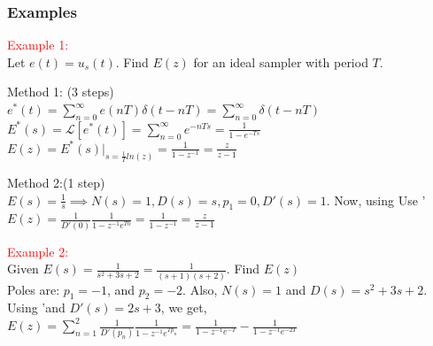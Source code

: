 \documentclass[mathserif, 10pt]{beamer} %
\def\2{\raisebox{.5pt}{\textcircled{\raisebox{-.9pt} {2}}}}
\begin{document}
\frame
{

\normalsize

\frametitle{Examples}

\textcolor{red}{ Example 1:}\\

Let $e(t) = u_s(t)$.  Find $E(z)$ for an ideal sampler with period $T$.\\ \vspace{.05in}

Method 1: (3 steps)\\
$e^*(t) = \sum\limits_{n=0}^{\infty} e(nT) \delta(t-nT) = \sum\limits_{n=0}^\infty \delta(t-nT)$\\
$E^*(s) = \mathcal{L}[e^*(t)] = \sum\limits_{n=0}^{\infty} e^{-nTs} = \frac{1}{1-e^{-Ts}}$\\
$E(z) = E^*(s)|_{s=\frac{1}{T}ln(z)} = \frac{1}{1-z^{-1}} = \frac{z}{z-1}$\\ \vspace{.07in}

Method 2:(1 step)\\

$E(s) = \frac{1}{s} \implies N(s) = 1, D(s) = s, p_1=0,D'(s) = 1$. Now, using Use \2'\\

$E(z) = \frac{1}{D'(0)}\frac{1}{1-z^{-1}e^{T0}} = \frac{1}{1-z^{-1}} = \frac{z}{z-1}$


\textcolor{red}{ Example 2:}\\

Given $E(s) = \frac{1}{s^2+3s+2} = \frac{1}{(s+1)(s+2)}$.  Find $E(z)$\\ \vspace{.05in}
Poles are:  $p_1 = -1$, and  $p_2 = -2$. Also, $N(s) = 1$ and
$D(s) = s^2+3s+2$. \\
Using \2'and $D'(s) = 2s+3$, we get, \\

$E(z) = \sum\limits_{n=1}^2 \frac{1}{D'(p_n)}\frac{1}{1-z^{-1}e^{Tp_n}} = \frac{1}{1-z^{-1}e^{-T}}-\frac{1}{1-z^{-1}e^{-2T}}$ \\




}
\end{document}
